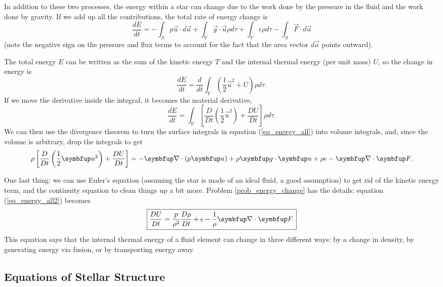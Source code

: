 In addition to these two processes, the energy within a star can change due to the work done by the pressure in the fluid and the work done by gravity.  If we add up all the contributions, the total rate of energy change is
\begin{equation}
\label{eq_energy_all}
\frac{dE}{dt} = - \int_S p \vec{u} \cdot d\vec{a} + \int_V \vec{g} \cdot \vec{u} \rho d\tau + \int_V \epsilon \rho d\tau - \int_S \vec{F} \cdot d\vec{a}
\end{equation}
(note the negative sign on the pressure and flux terms to account for the fact that the area vector $d\vec{a}$ points outward).

The total energy $E$ can be written as the sum of the kinetic energy $T$ and the internal thermal energy (per unit mass) $U$, so the change in energy is
\[
\frac{dE}{dt} = \frac{d}{dt}\int_V \left( \frac{1}{2} \vec{u}^2 + U \right) \rho d\tau.
\]
If we move the derivative inside the integral, it becomes the material derivative, 
\[
\frac{dE}{dt} = \int_V \left[ \frac{D}{Dt}\left( \frac{1}{2} \vec{u}^2 \right) + \frac{DU}{Dt} \right] \rho d\tau.
\]
We can then use the divergence theorem to turn the surface integrals in equation (\ref{eq_energy_all}) into volume integrals, and, since the volume is arbitrary, drop the integrals to get
\begin{equation}
\label{eq_energy_all2}
\rho \left[ \frac{D}{Dt}\left( \frac{1}{2} \vec{u}^2 \right) + \frac{DU}{Dt} \right] = -\grad \cdot (p\vec{u}) + \rho \vec{g} \cdot \vec{u} + \rho \epsilon - \grad \cdot \vec{F}.
\end{equation}

One last thing:  we can use Euler's equation (assuming the star is made of an ideal fluid, a good assumption) to get rid of the kinetic energy term, and the continuity equation to clean things up a bit more.  Problem \ref{prob_energy_change} has the details; equation (\ref{eq_energy_all2}) becomes
\begin{equation}
\label{eq_thermal_energy}
\boxed{
\frac{DU}{Dt} = \frac{p}{\rho^2} \frac{D\rho}{Dt} + \epsilon - \frac{1}{\rho} \grad \cdot \vec{F}.
}
\end{equation}
This equation says that the internal thermal energy of a fluid element can change in three different ways:  by a change in density, by generating energy via fusion, or by transporting energy away. 

\subsection{Equations of Stellar Structure}


